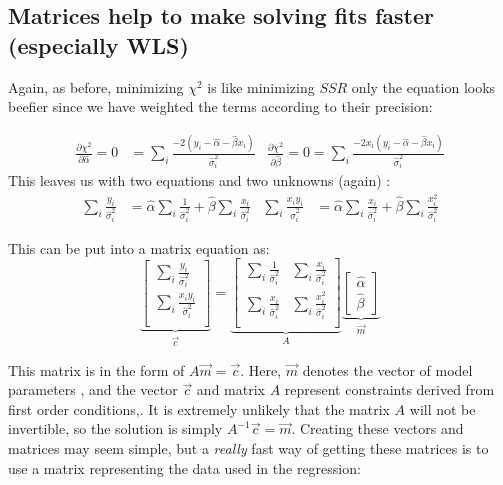 \subsection{Matrices help to make solving fits faster (especially WLS)}
Again, as before, minimizing $\chi^2$ is like minimizing $SSR$ only the equation looks beefier since we have weighted the terms according to their precision:

\begin{align}
\frac{\partial \chi^2}{\partial \hat \alpha} = 0 &= \sum_i \frac{-2(y_i - \hat \alpha - \hat \beta x_i)}{\hat \sigma_i^2} & \frac{\partial \chi^2}{\partial \hat \beta} =0 =  \sum_i \frac{-2x_i (y_i - \hat \alpha - \hat \beta x_i) }{\hat \sigma_i^2}
\end{align}
This leaves us with two equations and two unknowns (again) :
\begin{align}
\sum_i \frac{y_i}{\hat \sigma_i^2} &= \hat \alpha \sum_i \frac{1}{\hat \sigma_i^2} + \hat \beta \sum_i \frac{x_i}{\hat \sigma_i^2}       & \sum_i \frac{x_iy_i}{\hat \sigma_i^2} &= \hat \alpha \sum_i \frac{x_i}{\hat \sigma_i^2} + \hat \beta \sum_i \frac{x_i^2}{\hat \sigma_i^2}  
\end{align}

This can be put into a matrix equation as:
\begin{equation}
\underbrace{\begin{bmatrix}
  \sum_i \frac{y_i}{\hat \sigma_i^2} \\
  \sum_i \frac{x_iy_i}{\hat \sigma_i^2} \\
 \end{bmatrix}}_{\vec c}
=
\underbrace{\begin{bmatrix}
 \sum_i \frac{1}{\hat \sigma_i^2} & \sum_i \frac{x_i}{\hat \sigma_i^2} \\
 \sum_i \frac{x_i}{\hat \sigma_i^2} &  \sum_i \frac{x_i^2}{\hat \sigma_i^2}   \\
 \end{bmatrix}}_{A}
\underbrace{\begin{bmatrix}
\hat \alpha \\
\hat \beta
 \end{bmatrix}}_{\vec m}
\end{equation}

This matrix is in the form of $A\vec m = \vec c$. Here, $\vec m$ denotes the vector of model parameters , and the vector $\vec c$ and matrix $A$ represent constraints derived from first order conditions,. It is extremely unlikely that the matrix $A$ will not be invertible, so the solution is simply $A^{-1} \vec c = \vec m$. Creating these vectors and matrices may seem simple, but a \emph{really} fast way of getting these matrices is to use a matrix representing the data used in the regression:

